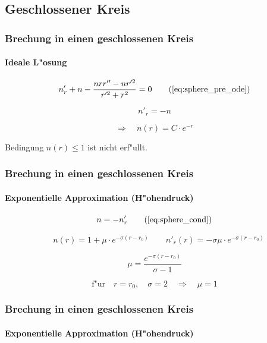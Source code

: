 \documentclass{beamer}
\begin{document}
{\begin{frame}
\begin{center}
    \end{center}
    
  \end{frame}
  
  \subsection{Geschlossener Kreis}
  \begin{frame}
    \frametitle{Brechung in einen geschlossenen Kreis}
    \framesubtitle{Ideale L"osung}

    \begin{equation*}
      n'_r + n - \frac{nrr''-nr'^2}{r'^2 + r^2} = 0 \tag{\ref{eq:sphere_pre_ode}}
    \end{equation*}        
      
    \begin{equation} \label{eq:sphere_cond}
      n'_r = -n
    \end{equation} 
    
    $$\Rightarrow \quad n(r) = C \cdot e^{-r}$$
    \begin{center}
      Bedingung $n(r) \leq 1$ ist nicht erf"ullt.  
    \end{center}    
    
  \end{frame}    
  
  \begin{frame}
    \frametitle{Brechung in einen geschlossenen Kreis}
    \framesubtitle{Exponentielle Approximation (H"ohendruck)}
    
    \begin{equation*}
      n = -n'_r  \tag{\ref{eq:sphere_cond}}  
    \end{equation*}    
    
    $$\quad n(r)=1 + \mu \cdot e^{-\sigma (r - r_0)} \qquad n'_r(r) = -\sigma \mu \cdot e^{-\sigma (r-r_0)}$$
    
    $$\mu = \frac{e^{-\sigma (r - r_0)}}{\sigma - 1}$$
    
    $$\text{f"ur} \quad r = r_0, \quad \sigma = 2 \quad \Rightarrow \quad \mu = 1$$
  \end{frame}
  
  \begin{frame}
    \frametitle{Brechung in einen geschlossenen Kreis}
    \framesubtitle{Exponentielle Approximation (H"ohendruck)}
    

\end{frame}}
\end{document}
